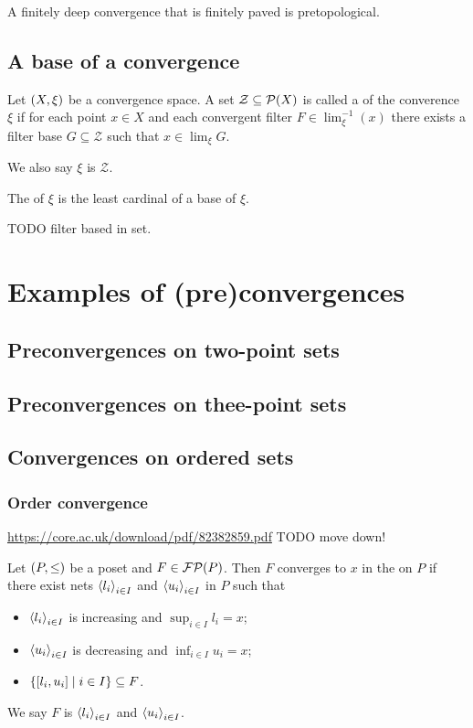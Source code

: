 \begin{proposition}
A finitely deep convergence that is finitely paved is pretopological.
\end{proposition}

\subsection{A base of a convergence}
\begin{definition}
Let $\left( X,\xi \right)$ be a convergence space. A set $\mathcal{Z}\subseteq \operatorname{\mathcal{P}}(X)$ is called a  of the converence $\xi$ if for each point $x\in X$ and each convergent filter $F\in\lim_\xi^{-1}(x)$ there exists a filter base $G\subseteq \mathcal{Z}$ such that $x\in \lim_\xi G$.

We also say $\xi$ is  $\mathcal{Z}$.

The  of $\xi$ is the least cardinal of a base of $\xi$.
\end{definition}
TODO filter based in set.


\section{Examples of (pre)convergences}
\subsection{Preconvergences on two-point sets}
\subsection{Preconvergences on thee-point sets}

\subsection{Convergences on ordered sets}
\subsubsection{Order convergence}
\url{https://core.ac.uk/download/pdf/82382859.pdf}
TODO move down!

\begin{definition}
Let $\left( P,\leq \right)$ be a poset and $F\in\operatorname{\mathcal{FP}}(P)$. Then $F$ converges to $x$ in the  on $P$ if there exist nets $\left\langle l_i \right\rangle_{i\in I}$ and $\left\langle u_i \right\rangle_{i\in I}$ in $P$ such that
\begin{itemize}
    \item $\left\langle l_i \right\rangle_{i\in I}$ is increasing and $\sup_{i\in I} l_i = x$;
    \item $\left\langle u_i \right\rangle_{i\in I}$ is decreasing and $\inf_{i\in I} u_i = x$;
    \item $\left\{ [l_i, u_i] \;\middle|\; i\in I \right\} \subseteq F$.
\end{itemize}
We say $F$ is  $\left\langle l_i \right\rangle_{i\in I}$ and $\left\langle u_i \right\rangle_{i\in I}$.
\end{definition}

